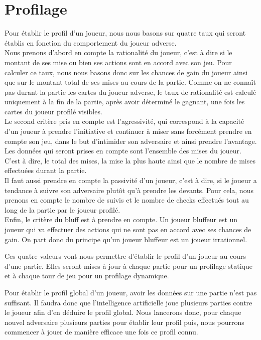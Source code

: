 \documentclass{report}
\begin{document}
\section{Profilage}
\hspace{0.5cm}Pour établir le profil d'un joueur, nous nous basons sur quatre taux qui seront établis en fonction du comportement du joueur adverse.\\

Nous prenons d'abord en compte la rationalité du joueur, c'est à dire si le montant de ses mise ou bien ses actions sont en accord avec son jeu. Pour calculer ce taux, nous nous basons donc sur les chances de gain du joueur ainsi que sur le montant total de ses mises au cours de la partie. Comme on ne connaît pas durant la partie les cartes du joueur adverse, le taux de rationalité est calculé uniquement à la fin de la partie, après avoir déterminé le gagnant, une fois les cartes du joueur profilé visibles.\\

Le second critère pris en compte est l'agressivité, qui correspond à la capacité d'un joueur à prendre l'initiative et continuer à miser sans forcément prendre en compte son jeu, dans le but d'intimider son adversaire et ainsi prendre l'avantage. Les données qui seront prises en compte sont l'ensemble des mises du joueur. C'est à dire, le total des mises, la mise la plus haute ainsi que le nombre de mises effectuées durant la partie. \\

Il faut aussi prendre en compte la passivité d'un joueur, c'est à dire, si le joueur a tendance à suivre son adversaire plutôt qu'à prendre les devants. Pour cela, nous prenons en compte le nombre de suivis et le nombre de checks effectués tout au long de la partie par le joueur profilé.\\

Enfin, le critère du bluff est à prendre en compte. Un joueur bluffeur est un joueur qui va effectuer des actions qui ne sont pas en accord avec ses chances de gain. On part donc du principe qu'un joueur bluffeur est un joueur irrationnel.\par

Ces quatre valeurs vont nous permettre d'établir le profil d'un joueur au cours d'une partie. Elles seront mises à jour à chaque partie pour un profilage statique et à chaque tour de jeu pour un profilage dynamique. \par

Pour établir le profil global d'un joueur, avoir les données sur une partie n'est pas suffisant. Il faudra donc que l'intelligence artificielle joue plusieurs parties contre le joueur afin d'en déduire le profil global. Nous lancerons donc, pour chaque nouvel adversaire plusieurs parties pour établir leur profil puis, nous pourrons commencer à jouer de manière efficace une fois ce profil connu.\\
\end{document}
